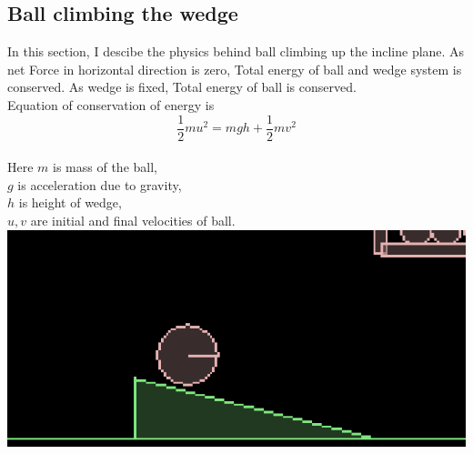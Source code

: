 \documentclass[11pt]{article}
\begin{document}
\subsection{Ball climbing the wedge}
In this section, I descibe the physics behind ball climbing up the incline plane. As net Force in horizontal direction is zero, Total energy of ball and wedge system is conserved.
 As wedge is fixed, Total energy of ball is conserved.\\Equation of conservation of energy is\cite{pandey08}
\begin{equation}\frac{1}{2}mu^{2}=mgh+\frac{1}{2}mv^{2}\end{equation}\\
 Here $m$ is mass of the ball,\\$g$ is acceleration due to gravity,\\$h$ is height of wedge,\\$u,v$ are initial and final velocities of ball.\\
\includegraphics{1}  
\end{document}
